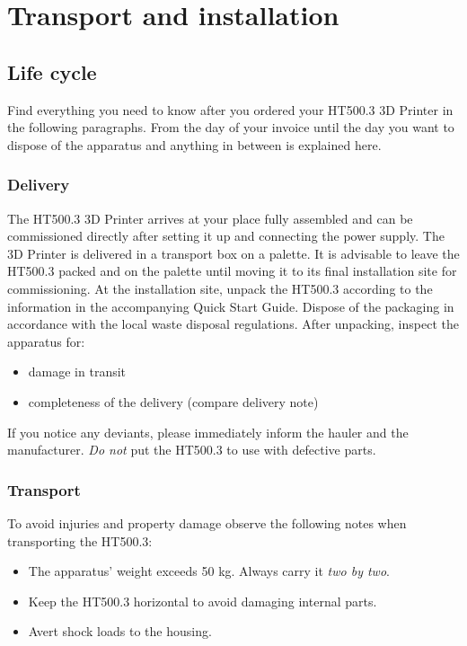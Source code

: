 \section{Transport and installation}



\subsection{Life cycle}

Find everything you need to know after you ordered your HT500.3 3D Printer in the following paragraphs. From the day of your invoice until the day you want to dispose of the apparatus and anything in between is explained here. 


\subsubsection{Delivery}

The HT500.3 3D Printer arrives at your place fully assembled and can be commissioned directly after setting it up and connecting the power supply.
The 3D Printer is delivered in a transport box on a palette. It is advisable to leave the HT500.3 packed and on the palette until moving it to its final installation site for commissioning.
At the installation site, unpack the HT500.3 according to the information in the accompanying Quick Start Guide.
Dispose of the packaging in accordance with the local waste disposal regulations.
After unpacking, inspect the apparatus for:

\begin{itemize}
  \item damage in transit
  \item completeness of the delivery (compare delivery note)
\end{itemize}

If you notice any deviants, please immediately inform the hauler and the manufacturer. \emph{Do not} put the HT500.3 to use with defective parts.


\subsubsection{Transport}

To avoid injuries and property damage observe the following notes when transporting the HT500.3:

\begin{itemize}
  \item The apparatus' weight exceeds 50 kg. Always carry it \emph{two by two}.
  \item Keep the HT500.3 horizontal to avoid damaging internal parts.
  \item Avert shock loads to the housing.
\end{itemize}


